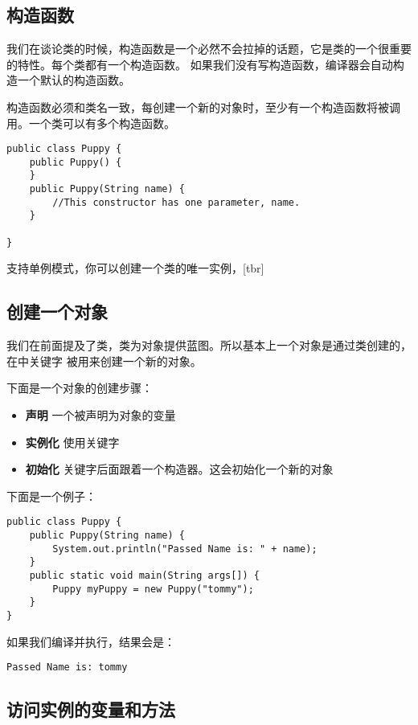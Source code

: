 \documentclass{article}
\begin{document}
\subsection{构造函数}
我们在谈论类的时候，构造函数是一个必然不会拉掉的话题，它是类的一个很重要的特性。每个类都有一个构造函数。
如果我们没有写构造函数，编译器会自动构造一个默认的构造函数。

构造函数必须和类名一致，每创建一个新的对象时，至少有一个构造函数将被调用。一个类可以有多个构造函数。

\begin{verbatim}
public class Puppy {
	public Puppy() {
	}
	public Puppy(String name) {
		//This constructor has one parameter, name.
	}

}
\end{verbatim}

 支持单例模式，你可以创建一个类的唯一实例，[tbr]

\subsection{创建一个对象}
我们在前面提及了类，类为对象提供蓝图。所以基本上一个对象是通过类创建的，在中关键字
被用来创建一个新的对象。

下面是一个对象的创建步骤：
\begin{itemize}
\item {\bf 声明} 一个被声明为对象的变量
\item {\bf 实例化} 使用关键字
\item {\bf 初始化} 关键字后面跟着一个构造器。这会初始化一个新的对象
\end{itemize}
下面是一个例子：

\begin{verbatim}
public class Puppy {
	public Puppy(String name) {
		System.out.println("Passed Name is: " + name);
	}
	public static void main(String args[]) {
		Puppy myPuppy = new Puppy("tommy");
	}
}
\end{verbatim}

如果我们编译并执行，结果会是：

\begin{verbatim}
Passed Name is: tommy
\end{verbatim}

\subsection{访问实例的变量和方法}
\end{document}
